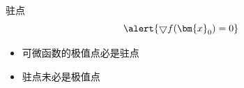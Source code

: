 \begin{frame}{驻点}
	\linespread{1.2}
	\vspace{-1em}
	$$\alert{\bigtriangledown f(\bm{x}_0)=0}$$
	\pause \vspace{-1em}
	\begin{itemize}
	  \item 可微函数的极值点必是驻点\pause 
	  \item 驻点未必是极值点\pause 
	\end{itemize}
	\vspace{-1em}
	\begin{columns}
			\begin{center}
				\pause 
			\end{center}
			\begin{center}
			\end{center}
	\end{columns}
\end{frame}

